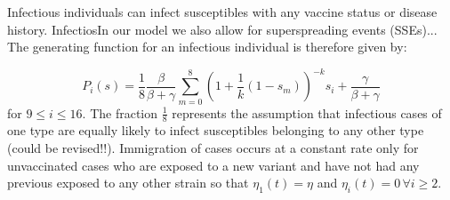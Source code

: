 \documentclass{article}
\begin{document}
Infectious individuals can infect susceptibles with any vaccine status or disease history. InfectiosIn our model we also allow for superspreading events (SSEs)... The generating function for an infectious individual is therefore given by:

\begin{equation}
P_i(s) = \frac{1}{8} \frac{\beta}{\beta+\gamma}\sum_{m=0}^8 (1 + \frac{1}{k}(1-s_m))^{-k} s_i + \frac{\gamma}{\beta+\gamma}
\end{equation}
for $9 \leq i \leq 16$. The fraction $\frac{1}{8}$ represents the assumption that infectious cases of one type are equally likely to infect susceptibles belonging to any other type (could be revised!!). Immigration of cases occurs at a constant rate only for unvaccinated cases who are exposed to a new variant and have not had any previous exposed to any other strain so that $\eta_1(t) = \eta$ and $\eta_i(t) = 0 \, \forall i \geq 2$.



\end{document}
